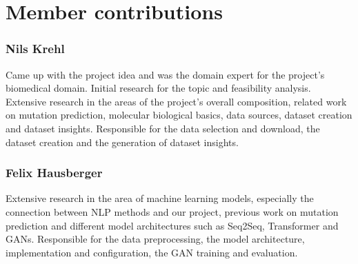 \section*{Member contributions}

\subsubsection*{Nils Krehl}

Came up with the project idea and was the domain expert for the project's biomedical domain. Initial research for the topic and feasibility analysis. Extensive research in the areas of the project's overall composition, related work on mutation prediction, molecular biological basics, data sources, dataset creation and dataset insights. Responsible for the data selection and download, the dataset creation and the generation of dataset insights.

\subsubsection*{Felix Hausberger}

Extensive research in the area of machine learning models, especially the connection between \ac{NLP} methods and our project, previous work on mutation prediction and different model architectures such as \ac{Seq2Seq}, Transformer and \acp{GAN}.
Responsible for the data preprocessing, the model architecture, implementation and configuration, the GAN training and evaluation.